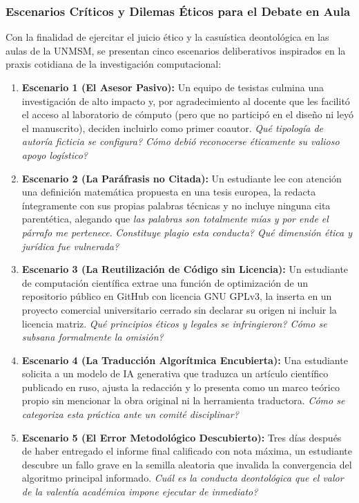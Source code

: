 \subsubsection{Escenarios Críticos y Dilemas Éticos para el Debate en Aula}

Con la finalidad de ejercitar el juicio ético y la casuística deontológica en las aulas de la UNMSM, se presentan cinco escenarios deliberativos inspirados en la praxis cotidiana de la investigación computacional:

\begin{enumerate}
    \item \textbf{Escenario 1 (El Asesor Pasivo):} Un equipo de tesistas culmina una investigación de alto impacto y, por agradecimiento al docente que les facilitó el acceso al laboratorio de cómputo (pero que no participó en el diseño ni leyó el manuscrito), deciden incluirlo como primer coautor. \textit{\textquestiondown Qué tipología de autoría ficticia se configura? \textquestiondown Cómo debió reconocerse éticamente su valioso apoyo logístico?}
    \item \textbf{Escenario 2 (La Paráfrasis no Citada):} Un estudiante lee con atención una definición matemática propuesta en una tesis europea, la redacta íntegramente con sus propias palabras técnicas y no incluye ninguna cita parentética, alegando que \textsl{\guillemotleft las palabras son totalmente mías y por ende el párrafo me pertenece\guillemotright}. \textit{\textquestiondown Constituye plagio esta conducta? \textquestiondown Qué dimensión ética y jurídica fue vulnerada?}
    \item \textbf{Escenario 3 (La Reutilización de Código sin Licencia):} Un estudiante de computación científica extrae una función de optimización de un repositorio público en GitHub con licencia GNU GPLv3, la inserta en un proyecto comercial universitario cerrado sin declarar su origen ni incluir la licencia matriz. \textit{\textquestiondown Qué principios éticos y legales se infringieron? \textquestiondown Cómo se subsana formalmente la omisión?}
    \item \textbf{Escenario 4 (La Traducción Algorítmica Encubierta):} Una estudiante solicita a un modelo de IA generativa que traduzca un artículo científico publicado en ruso, ajusta la redacción y lo presenta como un marco teórico propio sin mencionar la obra original ni la herramienta traductora. \textit{\textquestiondown Cómo se categoriza esta práctica ante un comité disciplinar?}
    \item \textbf{Escenario 5 (El Error Metodológico Descubierto):} Tres días después de haber entregado el informe final calificado con nota máxima, un estudiante descubre un fallo grave en la semilla aleatoria que invalida la convergencia del algoritmo principal informado. \textit{\textquestiondown Cuál es la conducta deontológica que el valor de la valentía académica impone ejecutar de inmediato?}
\end{enumerate}

